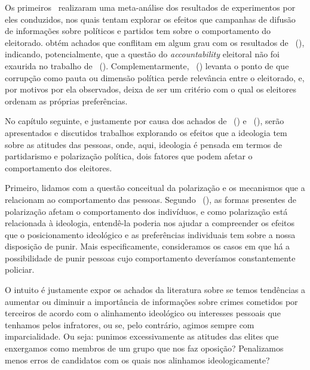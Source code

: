 \documentclass[
	12pt,				%
	openright,			%
	twoside,			%
	a4paper,			%
	openany,
	english,			%
	brazil				%
	]{abntex2}
\begin{document}
Os primeiros~\cite{dunning2019voter} realizaram uma meta-análise dos resultados de experimentos por eles conduzidos, nos quais tentam explorar os efeitos que campanhas de difusão de informações sobre políticos e partidos tem sobre o comportamento do eleitorado. \cite{dunning2019voter} obtém achados que conflitam em algum grau com os resultados de ~(\citeyear{ferraz2008exposing}), indicando, potencialmente, que a questão do \textit{accountability} eleitoral não foi exaurida no trabalho de ~(\citeyear{ferraz2008exposing}). Complementarmente, ~(\citeyear{Pavao2018Jul}) levanta o ponto de que corrupção como pauta ou dimensão política perde relevância entre o eleitorado, e, por motivos por ela observados, deixa de ser um critério com o qual os eleitores ordenam as próprias preferências.


No capítulo seguinte, e justamente por causa dos achados de ~(\citeyear{dunning2019voter}) e ~(\citeyear{Pavao2018Jul}), serão apresentados e discutidos trabalhos explorando os efeitos que a ideologia tem sobre as atitudes das pessoas, onde, aqui, ideologia é pensada em termos de partidarismo e polarização política, dois fatores que podem afetar o comportamento dos eleitores.

Primeiro, lidamos com a questão conceitual da polarização e os mecanismos que a relacionam ao comportamento das pessoas. Segundo ~(\citeyear{Bednar2021Dec}), as formas presentes de polarização afetam o comportamento dos indivíduos, e como polarização está relacionada à ideologia, entendê-la poderia nos ajudar a compreender os efeitos que o posicionamento ideológico e as preferências individuais tem sobre a nossa disposição de punir. Mais especificamente, consideramos os casos em que há a possibilidade de punir pessoas cujo comportamento deveríamos constantemente policiar.

O intuito é justamente expor os achados da literatura sobre se temos tendências a aumentar ou diminuir a importância de informações sobre crimes cometidos por terceiros de acordo com o alinhamento ideológico ou interesses pessoais que tenhamos pelos infratores, ou se, pelo contrário, agimos sempre com imparcialidade. Ou seja: punimos excessivamente as atitudes das elites que enxergamos como membros de um grupo que nos faz oposição? Penalizamos menos erros de candidatos com os quais nos alinhamos ideologicamente?
\end{document}
